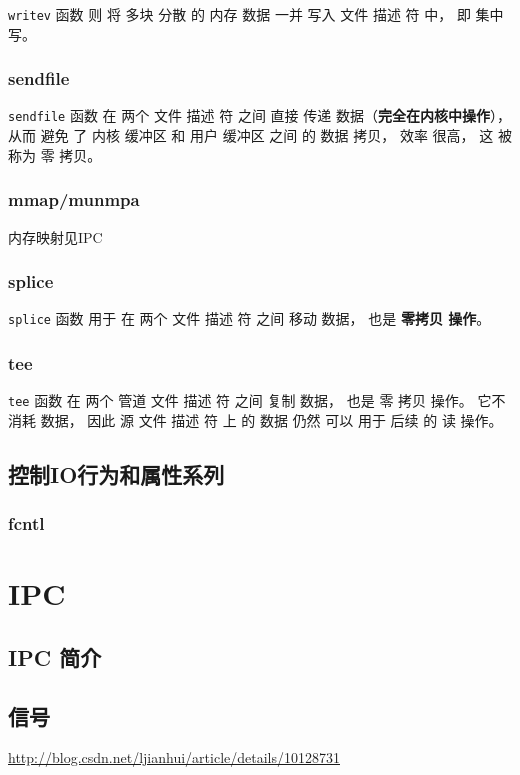 \documentclass[UTF8,a4paper,12pt]{ctexbook}
\begin{document}
				\verb|writev| 函数 则 将 多块 分散 的 内存 数据 一并 写入 文件 描述 符 中， 即 集中 写。
				
			\subsubsection{sendfile}
				\verb|sendfile| 函数 在 两个 文件 描述 符 之间 直接 传递 数据（\textbf{完全在内核中操作}）， 从而 避免 了 内核 缓冲区 和 用户 缓冲区 之间 的 数据 拷贝， 效率 很高， 这 被称为 零 拷贝。
			
			\subsubsection{mmap/munmpa}
				内存映射见IPC
				
			\subsubsection{splice}
				\verb|splice| 函数 用于 在 两个 文件 描述 符 之间 移动 数据， 也是 \textbf{零拷贝 操作}。
				
			\subsubsection{tee}
				\verb|tee| 函数 在 两个 管道 文件 描述 符 之间 复制 数据， 也是 零 拷贝 操作。 它不 消耗 数据， 因此 源 文件 描述 符 上 的 数据 仍然 可以 用于 后续 的 读 操作。
			
		\subsection{控制IO行为和属性系列}
			\subsubsection{fcntl}
	
	\section{IPC}
		\subsection{IPC 简介}
			
		\subsection{信号}
			\url{http://blog.csdn.net/ljianhui/article/details/10128731}
\end{document}
